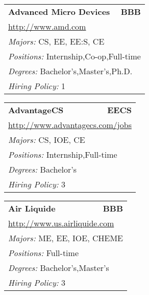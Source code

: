 \documentclass[twoside]{article}
\begin{document}
\begin{center}
\begin{multicols}{3}
\begin{FlushLeft}
\begin{minipage}{\columnwidth}
\end{minipage}
 
\begin{minipage}{\columnwidth}\begin{tabularx}{.95\columnwidth}{Xr}
                 {\Large\bf Advanced Micro Devices} & {\Large\bf BBB}\\
    \multicolumn{2}{p{.95\columnwidth}}{\url{http://www.amd.com}}\\
    \multicolumn{2}{p{.95\columnwidth}}{\emph{Majors:} CS, EE, EE:S, CE}\\
    \multicolumn{2}{p{.95\columnwidth}}{\emph{Positions:} Internship,Co-op,Full-time}\\
    \multicolumn{2}{p{.95\columnwidth}}{\emph{Degrees:} Bachelor's,Master's,Ph.D.}\\
    \multicolumn{2}{p{.95\columnwidth}}{\emph{Hiring Policy:} 1}\\
    \end{tabularx}
    
\end{minipage}
 
\begin{minipage}{\columnwidth}\begin{tabularx}{.95\columnwidth}{Xr}
                 {\Large\bf AdvantageCS} & {\Large\bf EECS}\\
    \multicolumn{2}{p{.95\columnwidth}}{\url{http://www.advantagecs.com/jobs}}\\
    \multicolumn{2}{p{.95\columnwidth}}{\emph{Majors:} CS, IOE, CE}\\
    \multicolumn{2}{p{.95\columnwidth}}{\emph{Positions:} Internship,Full-time}\\
    \multicolumn{2}{p{.95\columnwidth}}{\emph{Degrees:} Bachelor's}\\
    \multicolumn{2}{p{.95\columnwidth}}{\emph{Hiring Policy:} 3}\\
    \end{tabularx}
    
\end{minipage}
 
\begin{minipage}{\columnwidth}\begin{tabularx}{.95\columnwidth}{Xr}
                 {\Large\bf Air Liquide} & {\Large\bf BBB}\\
    \multicolumn{2}{p{.95\columnwidth}}{\url{http://www.us.airliquide.com}}\\
    \multicolumn{2}{p{.95\columnwidth}}{\emph{Majors:} ME, EE, IOE, CHEME}\\
    \multicolumn{2}{p{.95\columnwidth}}{\emph{Positions:} Full-time}\\
    \multicolumn{2}{p{.95\columnwidth}}{\emph{Degrees:} Bachelor's,Master's}\\
    \multicolumn{2}{p{.95\columnwidth}}{\emph{Hiring Policy:} 3}\\
    \end{tabularx}
    

\end{minipage}
\end{FlushLeft}
\end{multicols}
\end{center}
\end{document}
